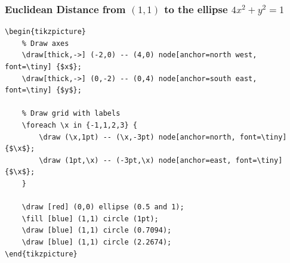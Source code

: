 \documentclass{beamer}
\begin{document}
\begin{frame}[fragile]
\frametitle{Euclidean Distance from $(1,1)$ to the ellipse $4x^2 + y^2 = 1$}
\begin{center}
%
\begin{minipage}[b]{.8\linewidth}
\tiny
\begin{verbatim}
\begin{tikzpicture}
    % Draw axes
    \draw[thick,->] (-2,0) -- (4,0) node[anchor=north west, font=\tiny] {$x$};
    \draw[thick,->] (0,-2) -- (0,4) node[anchor=south east, font=\tiny] {$y$};

    % Draw grid with labels
    \foreach \x in {-1,1,2,3} {
        \draw (\x,1pt) -- (\x,-3pt) node[anchor=north, font=\tiny] {$\x$};
        \draw (1pt,\x) -- (-3pt,\x) node[anchor=east, font=\tiny] {$\x$};
    }

    \draw [red] (0,0) ellipse (0.5 and 1);
    \fill [blue] (1,1) circle (1pt);
    \draw [blue] (1,1) circle (0.7094);
    \draw [blue] (1,1) circle (2.2674);
\end{tikzpicture}
\end{verbatim}
\end{minipage}
\end{center}
\end{frame}
\end{document}
